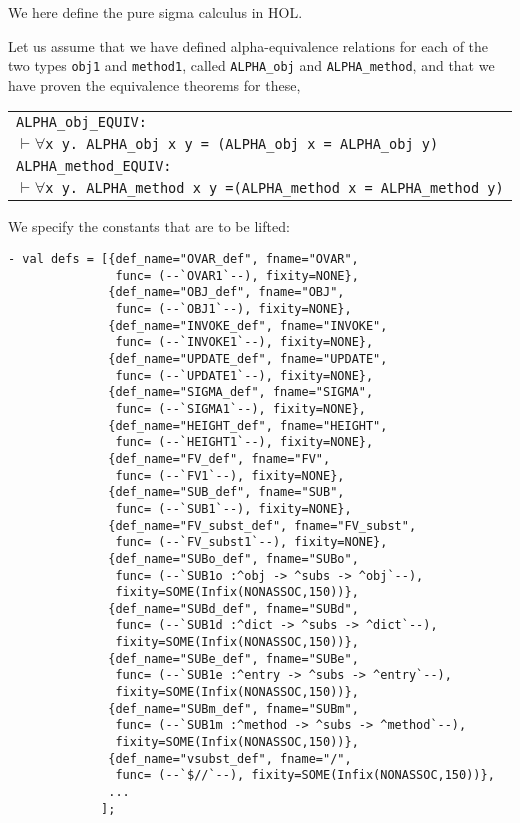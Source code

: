 \documentclass[envcountsame,runningheads]{llncs}
\begin{document}
We here define the pure sigma calculus in HOL.

Let us assume
that we have defined alpha-equivalence relations for each of the two types
{\tt obj1}
and {\tt method1}, called
{\tt ALPHA\_obj}
and {\tt ALPHA\_method},
and that we have proven the
equivalence theorems for these,
\begin{center}
\begin{tabular}{l}
{\tt ALPHA\_obj\_EQUIV:} \\
\hspace{0.9cm}
{\tt $\vdash \forall$x y. ALPHA\_obj x y = (ALPHA\_obj x = ALPHA\_obj y)} \\
{\tt ALPHA\_method\_EQUIV:} \\
\hspace{0.9cm}
{\tt $\vdash \forall$x y. ALPHA\_method x y =\;(ALPHA\_method x = ALPHA\_method y)}
\end{tabular}
\end{center}

We specify the constants that are to be lifted:
\begin{verbatim}
- val defs = [{def_name="OVAR_def", fname="OVAR",
               func= (--`OVAR1`--), fixity=NONE},
              {def_name="OBJ_def", fname="OBJ",
               func= (--`OBJ1`--), fixity=NONE},
              {def_name="INVOKE_def", fname="INVOKE",
               func= (--`INVOKE1`--), fixity=NONE},
              {def_name="UPDATE_def", fname="UPDATE",
               func= (--`UPDATE1`--), fixity=NONE},
              {def_name="SIGMA_def", fname="SIGMA",
               func= (--`SIGMA1`--), fixity=NONE},
              {def_name="HEIGHT_def", fname="HEIGHT",
               func= (--`HEIGHT1`--), fixity=NONE},
              {def_name="FV_def", fname="FV",
               func= (--`FV1`--), fixity=NONE},
              {def_name="SUB_def", fname="SUB",
               func= (--`SUB1`--), fixity=NONE},
              {def_name="FV_subst_def", fname="FV_subst",
               func= (--`FV_subst1`--), fixity=NONE},
              {def_name="SUBo_def", fname="SUBo",
               func= (--`SUB1o :^obj -> ^subs -> ^obj`--),
               fixity=SOME(Infix(NONASSOC,150))},
              {def_name="SUBd_def", fname="SUBd",
               func= (--`SUB1d :^dict -> ^subs -> ^dict`--),
               fixity=SOME(Infix(NONASSOC,150))},
              {def_name="SUBe_def", fname="SUBe",
               func= (--`SUB1e :^entry -> ^subs -> ^entry`--),
               fixity=SOME(Infix(NONASSOC,150))},
              {def_name="SUBm_def", fname="SUBm",
               func= (--`SUB1m :^method -> ^subs -> ^method`--),
               fixity=SOME(Infix(NONASSOC,150))},
              {def_name="vsubst_def", fname="/",
               func= (--`$//`--), fixity=SOME(Infix(NONASSOC,150))},
              ...
             ];
\end{verbatim}
\end{document}
